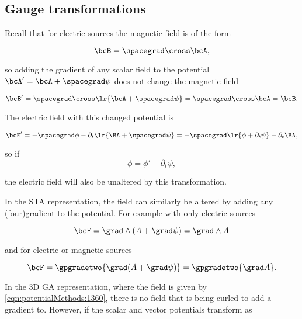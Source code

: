 \subsection{Gauge transformations}

Recall that for electric sources the magnetic field is of the form

\begin{dmath}\label{eqn:potentialMethods:1380}
\bcB = \spacegrad \cross \bcA,
\end{dmath}

so adding the gradient of any scalar field to the potential \( \bcA' = \bcA + \spacegrad \psi \)
does not change the magnetic field

\begin{dmath}\label{eqn:potentialMethods:1400}
\bcB'
= \spacegrad \cross \lr{ \bcA + \spacegrad \psi }
= \spacegrad \cross \bcA
= \bcB.
\end{dmath}

The electric field with this changed potential is

\begin{dmath}\label{eqn:potentialMethods:1420}
\bcE'
= -\spacegrad \phi - \partial_t \lr{ \BA + \spacegrad \psi}
= -\spacegrad \lr{ \phi + \partial_t \psi } - \partial_t \BA,
\end{dmath}

so if
\begin{dmath}\label{eqn:potentialMethods:1440}
\phi = \phi' - \partial_t \psi,
\end{dmath}

the electric field will also be unaltered by this transformation.

In the STA representation, the field can similarly be altered by adding any (four)gradient to the potential.  For example with only electric sources

\begin{dmath}\label{eqn:potentialMethods:1460}
\bcF = \grad \wedge (A + \grad \psi) = \grad \wedge A
\end{dmath}

and for electric or magnetic sources

\begin{dmath}\label{eqn:potentialMethods:1480}
\bcF = \gpgradetwo{ \grad (A + \grad \psi) } = \gpgradetwo{ \grad A }.
\end{dmath}

In the 3D GA representation, where the field is given by \cref{eqn:potentialMethods:1360}, there is no field that is being curled to add a gradient to.  However, if the scalar and vector potentials transform as


